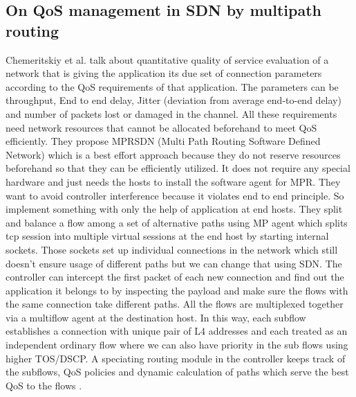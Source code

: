 \documentclass[paper=a4, fontsize=11pt]{scrartcl}	%
\numberwithin{equation}{section}		%
\numberwithin{figure}{section}			%
\numberwithin{table}{section}				%
\begin{document}
\subsection{On QoS management in SDN by multipath routing}
Chemeritskiy et al. talk about quantitative quality of service evaluation of a network that is giving the application its due set of connection parameters according to the QoS requirements of that application. The parameters can be throughput,
End to end delay, Jitter (deviation from average end-to-end delay) and number of packets lost or damaged in the channel. All these requirements need network resources that cannot be allocated beforehand to meet QoS efficiently. They propose MPRSDN (Multi Path Routing Software Defined Network) which is a best effort approach because they do not reserve resources beforehand so that they can be efficiently utilized. It does not require any special hardware and just needs the hosts to install the software agent for MPR. They want to avoid controller interference because it violates end to end principle. So implement something with only the help of application at end hosts. They split and balance a flow among a set of alternative paths using MP agent which splits tcp session into multiple virtual sessions at the end host by starting internal sockets. Those sockets set up individual connections in the network which still doesn't ensure usage of different paths but we can change that using SDN. The controller can intercept the first packet of each new connection and find out the application it belongs to by inspecting the payload and make sure the flows with the same connection take different paths. All the flows are multiplexed together via a multiflow agent at the destination host. In this way, each subflow establishes a connection with unique pair of L4 addresses and each treated as an independent ordinary flow where we can also have priority in the sub flows using higher TOS/DSCP. A speciating routing module in the controller keeps track of the subflows, QoS policies and dynamic calculation of paths which serve the best QoS to the flows \cite{multipath}.
\end{document}
